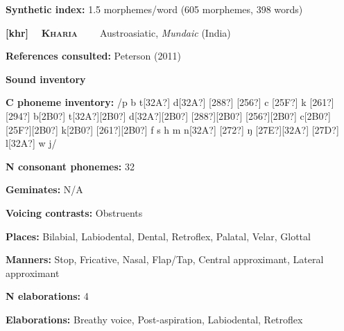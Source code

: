 \begin{styleBody}
\textbf{Synthetic index: }1.5 morphemes/word (605 morphemes, 398 words)
\end{styleBody}

\clearpage\begin{styleBody}
\textbf{[khr] }\ \ \textbf{\textsc{Kharia}}\textbf{\ \ \ \ }Austroasiatic, \textit{Mundaic }(India)
\end{styleBody}

\begin{styleBody}
\textbf{References consulted: }Peterson (2011)
\end{styleBody}

\begin{styleBody}
\textbf{Sound inventory}
\end{styleBody}

\begin{styleBody}
\textbf{C phoneme inventory:} /p b t[32A?] d[32A?] [288?] [256?] c [25F?] k [261?] [294?] b[2B0?] t[32A?][2B0?] d[32A?][2B0?] [288?][2B0?] [256?][2B0?] c[2B0?] [25F?][2B0?] k[2B0?] [261?][2B0?] f s h m n[32A?] [272?] ŋ [27E?][32A?] [27D?] l[32A?] w j/
\end{styleBody}

\begin{styleBody}
\textbf{N consonant phonemes:} 32
\end{styleBody}

\begin{styleBody}
\textbf{Geminates:} N/A
\end{styleBody}

\begin{styleBody}
\textbf{Voicing contrasts:} Obstruents
\end{styleBody}

\begin{styleBody}
\textbf{Places:} Bilabial, Labiodental, Dental, Retroflex, Palatal, Velar, Glottal
\end{styleBody}

\begin{styleBody}
\textbf{Manners:} Stop, Fricative, Nasal, Flap/Tap, Central approximant, Lateral approximant
\end{styleBody}

\begin{styleBody}
\textbf{N elaborations:} 4
\end{styleBody}

\begin{styleBody}
\textbf{Elaborations:} Breathy voice, Post-aspiration, Labiodental, Retroflex
\end{styleBody}

